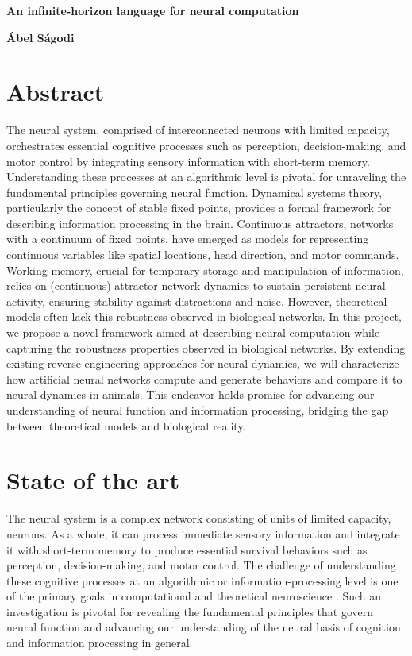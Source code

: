 \documentclass[12pt,letterpaper, onecolumn]{article}
\theoremstyle{definition}
\theoremstyle{remark}
\begin{document}

\begin{center}
\LARGE{\bf An infinite-horizon language for neural computation}
\end{center}
\begin{center}
{\textbf{\'Abel S\'agodi}}
\end{center}

\section*{Abstract}
The neural system, comprised of interconnected neurons with limited capacity, orchestrates essential cognitive processes such as perception, decision-making, and motor control by integrating sensory information with short-term memory. Understanding these processes at an algorithmic level is pivotal for unraveling the fundamental principles governing neural function. Dynamical systems theory, particularly the concept of stable fixed points, provides a formal framework for describing information processing in the brain. Continuous attractors, networks with a continuum of fixed points, have emerged as models for representing continuous variables like spatial locations, head direction, and motor commands. 
Working memory, crucial for temporary storage and manipulation of information, relies on (continuous) attractor network dynamics to sustain persistent neural activity, ensuring stability against distractions and noise. However, theoretical models often lack this robustness observed in biological networks.
In this project, we propose a novel framework aimed at describing neural computation while capturing the robustness properties observed in biological networks. By extending existing reverse engineering approaches for neural dynamics, we will characterize how artificial neural networks compute and generate behaviors and compare it to neural dynamics in animals. This endeavor holds promise for advancing our understanding of neural function and information processing, bridging the gap between theoretical models and biological reality.

\newpage
\section{State of the art}
The neural system is a complex network consisting of units of limited capacity, neurons.
As a whole, it can process immediate sensory information and integrate it with short-term memory to produce essential survival behaviors such as perception, decision-making, and motor control.
The challenge of understanding these cognitive processes at an algorithmic or information-processing level is one of the primary goals in computational and theoretical neuroscience \citep{zoltowski2020general, pagan2022, whiteway2019, dyer2023simplest}.
Such an investigation is pivotal for revealing the fundamental principles that govern neural function and advancing our understanding of the neural basis of cognition and information processing in general.
\end{document}
